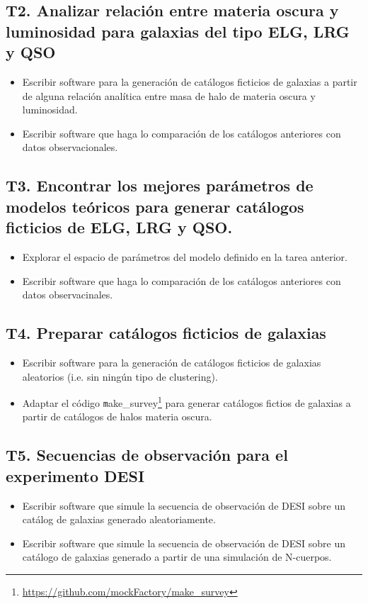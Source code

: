 \subsection*{T2. Analizar relaci\'on entre materia oscura y luminosidad para galaxias del tipo ELG, LRG y QSO}
\begin{itemize}
\item[T2.1] \gradA\prof 
  Escribir software para la generaci\'on de cat\'alogos
  ficticios de galaxias a partir de alguna relaci\'on anal\'itica
  entre masa de halo de materia oscura y luminosidad.
\item[T2.2] \gradA\prof 
  Escribir software que haga lo comparaci\'on de los cat\'alogos
  anteriores con datos observacionales.
\end{itemize}

\subsection*{T3. Encontrar los mejores par\'ametros de modelos
  te\'oricos para generar cat\'alogos ficticios de ELG, LRG y QSO.}
\begin{itemize}
\item[T3.1] \gradA\prof  
  Explorar el espacio de par\'ametros del modelo definido en la tarea anterior. 
\item[T3.2] \gradA\prof  
  Escribir software que haga lo comparaci\'on
  de los cat\'alogos anteriores con datos observacinales.
\end{itemize}


\subsection*{T4. Preparar cat\'alogos ficticios de galaxias}
\begin{itemize}
\item[T4.1] \gradA\prof Escribir software para la generaci\'on de cat\'alogos
  ficticios de galaxias aleatorios (i.e. sin ning\'un tipo de
  clustering). 
\item[T4.2] \gradA\prof Adaptar el c\'odigo {\texttt
  make\_survey}\footnote{\url{https://github.com/mockFactory/make_survey}}
  para generar  cat\'alogos fictios de galaxias a partir de
  cat\'alogos de halos materia oscura. 
\end{itemize}

\subsection*{T5. Secuencias de observaci\'on para el experimento DESI}
\begin{itemize}
\item[T5.1] \prof Escribir software que simule la secuencia de observaci\'on
  de DESI sobre un cat\'alog de galaxias generado aleatoriamente. 
\item[T5.2] \prof Escribir software que simule la secuencia de observaci\'on
  de DESI sobre un cat\'alogo de galaxias generado a partir de una
  simulaci\'on de N-cuerpos. 
\end{itemize}

